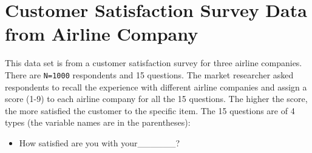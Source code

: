 \documentclass[12pt,]{krantz}
\providecommand{\tightlist}{%
  \setlength{\itemsep}{0pt}\setlength{\parskip}{0pt}}
\theoremstyle{definition}
\theoremstyle{definition}
\theoremstyle{definition}
\theoremstyle{remark}
\begin{document}
\section{Customer Satisfaction Survey Data from Airline
Company}\label{customer-satisfaction-survey-data-from-airline-company}

This data set is from a customer satisfaction survey for three airline
companies. There are \texttt{N=1000} respondents and 15 questions. The
market researcher asked respondents to recall the experience with
different airline companies and assign a score (1-9) to each airline
company for all the 15 questions. The higher the score, the more
satisfied the customer to the specific item. The 15 questions are of 4
types (the variable names are in the parentheses):

\begin{itemize}
\tightlist
\item
  How satisfied are you with your\_\_\_\_\_\_?
\end{itemize}
\end{document}
